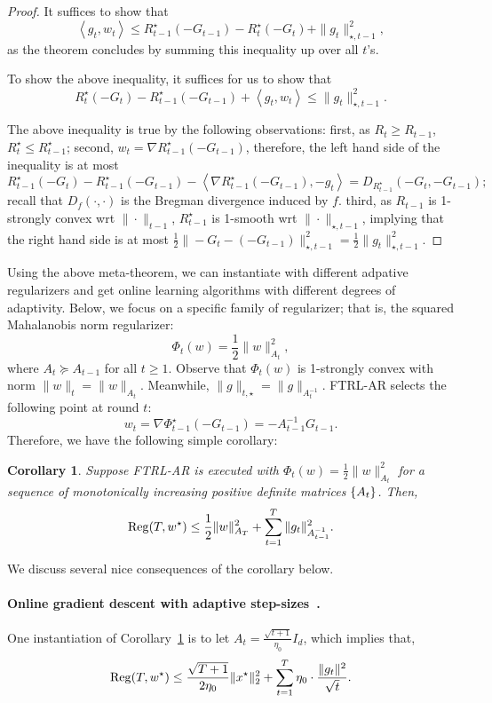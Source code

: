 \documentclass{article}
\newtheorem{corollary}{Corollary}
\DeclareMathOperator*{\Reg}{{\rm Reg}}
\DeclareMathOperator*{\argmin}{{\rm argmin}}
\newcommand{\inner}[2]{\left\langle #1,#2 \right\rangle}
\begin{document}
\begin{proof}
It suffices to show that
\[ \inner{g_t}{w_t} \leq R_{t-1}^\star(-G_{t-1}) - R_t^\star(-G_t) + \| g_t \|_{\star, t-1}^2, \]
as the theorem concludes by summing this inequality up over all $t$'s.

To show the above inequality, it suffices for us to show that
\[ R_t^\star(-G_t) - R_{t-1}^\star(-G_{t-1}) + \inner{g_t}{w_t} \leq \| g_t \|_{\star, t-1}^2. \]

The above inequality is true by the following observations: first, as $R_t \geq R_{t-1}$, $R_t^\star \leq R_{t-1}^\star$; second, $w_t = \nabla R_{t-1}^\star(-G_{t-1})$, therefore,
the left hand side of the inequality is at most
\[ R_{t-1}^\star(-G_t) - R_{t-1}^\star(-G_{t-1}) - \inner{\nabla R_{t-1}^\star(-G_{t-1})}{-g_t} = D_{R_{t-1}^\star}(-G_t, -G_{t-1}); \]
recall that $D_f(\cdot, \cdot)$ is the Bregman divergence induced by $f$.
third, as $R_{t-1}$ is 1-strongly convex wrt $\| \cdot \|_{t-1}$, $R_{t-1}^\star$ is 1-smooth wrt $\| \cdot \|_{\star, t-1}$, implying that the right hand side is at most $\frac12 \| -G_t - (-G_{t-1}) \|_{\star, t-1}^2 = \frac12 \| g_t \|_{\star, t-1}^2$.
\end{proof}

Using the above meta-theorem, we can instantiate with different adpative regularizers and get online learning algorithms with different degrees of adaptivity. Below, we focus on a specific family of regularizer; that is, the squared Mahalanobis norm regularizer:
\[ \Phi_t(w) = \frac12 \| w \|_{A_t}^2, \]
where $A_t \succeq A_{t-1}$ for all $t \geq 1$. Observe that $\Phi_t(w)$ is 1-strongly convex with norm $\| w \|_t = \| w \|_{A_t}$. Meanwhile, $\| g \|_{t,\star} = \| g \|_{A_t^{-1}}$. FTRL-AR selects the following point at round $t$:
\[ w_t = \nabla \Phi_{t-1}^\star(-G_{t-1}) = -A_{t-1}^{-1} G_{t-1}. \]
Therefore, we have the following simple corollary:
\begin{corollary}
Suppose FTRL-AR is executed with $\Phi_t(w) = \frac12 \| w \|_{A_t}^2$ for a sequence of monotonically increasing positive definite matrices $\cbr{A_t}$. Then,
\[ \Reg(T, w^\star) \leq \frac{1}{2}\| w \|_{A_T}^2 + \sum_{t=1}^T \| g_t \|_{A_{t-1}^{-1}}^2. \]
\label{cor:ftal-ar-pd}
\end{corollary}
We discuss several nice consequences of the corollary below.


\paragraph{Online gradient descent with adaptive step-sizes~\cite{zinkevich2003online}.} One instantiation of Corollary~\ref{cor:ftal-ar-pd} is to let $A_t = \frac{\sqrt{t+1}}{\eta_0} I_d$, which implies that,
\[ \Reg(T, w^\star) \leq \frac{\sqrt{T+1}}{2\eta_0} \| x^\star \|_2^2 + \sum_{t=1}^T \eta_0 \cdot \frac{\| g_t \|^2}{\sqrt{t}}.  \]
\end{document}

